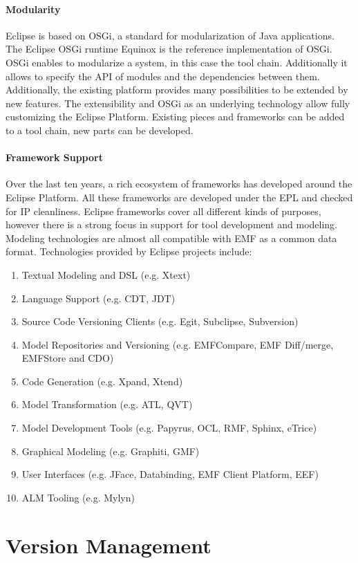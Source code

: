 \paragraph{Modularity}
Eclipse is based on OSGi, a standard for modularization of Java
applications. The Eclipse OSGi runtime Equinox is the reference
implementation of OSGi. OSGi enables to modularize a system, in this
case the tool chain. Additionally it allows to specify the API of
modules and the dependencies between them. Additionally, the existing
platform provides many possibilities to be extended by new
features. The extensibility and OSGi as an underlying technology allow
fully customizing the Eclipse Platform. Existing pieces and frameworks
can be added to a tool chain, new parts can be developed.

\paragraph{Framework Support}
Over the last ten years, a rich ecosystem of frameworks has developed
around the Eclipse Platform. All these frameworks are developed under
the EPL and checked for IP cleanliness. Eclipse frameworks cover all
different kinds of purposes, however there is a strong focus in
support for tool development and modeling. Modeling technologies are
almost all compatible with EMF as a common data format. Technologies
provided by Eclipse projects include:
\begin{enumerate}
\item Textual Modeling and DSL (e.g. Xtext)
\item Language Support (e.g. CDT, JDT)
\item Source Code Versioning Clients (e.g. Egit, Subclipse, Subversion)
\item Model Repositories and Versioning (e.g. EMFCompare, EMF Diff/merge, EMFStore and CDO)
\item Code Generation (e.g. Xpand, Xtend)
\item Model Transformation (e.g. ATL, QVT)
\item Model Development Tools (e.g. Papyrus, OCL, RMF, Sphinx, eTrice)
\item Graphical Modeling (e.g. Graphiti, GMF)
\item User Interfaces (e.g. JFace, Databinding, EMF Client Platform, EEF)
\item ALM Tooling (e.g. Mylyn)
\end{enumerate}


\section{Version Management}

